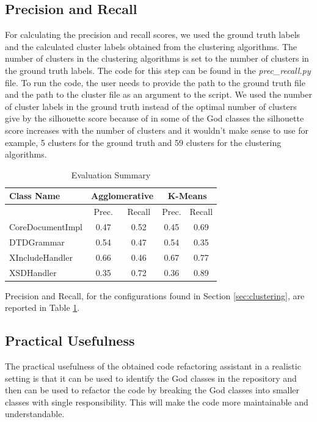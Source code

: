 \documentclass{article}
\newcommand\templateInstruction[1]{
\hl{#1}
}
\begin{document}
\subsection{Precision and Recall}
For calculating the precision and recall scores, we used the ground truth labels and the calculated cluster labels obtained from the clustering algorithms. 
The number of clusters in the clustering algorithms is set to the number of clusters in the ground truth labels. The code for this step can be found in the \textit{prec\_recall.py} file.
To run the code, the user needs to provide the path to the ground truth file and the path to the cluster file as an argument to the script.
We used the number of cluster labels in the ground truth instead of the optimal number of clusters give by the silhouette score because of in some of the God classes the silhouette score increases with the number of clusters and it wouldn't make sense to use for example,
5 clusters for the ground truth and 59 clusters for the clustering algorithms.
\begin{table}[]
    \centering
    \begin{tabular}{lcccc}
        \hline
        \textbf{Class Name} &\multicolumn{2}{c}{\textbf{Agglomerative}} & \multicolumn{2}{c}{\textbf{K-Means}} \\
        \hline
         &Prec. & Recall & Prec. & Recall \\
        \hline\hline
        {CoreDocumentImpl} & {0.47} & {0.52}& {0.45}& {0.69}\\
       {DTDGrammar} & {0.54} & {0.47}& {0.54}& {0.35}\\
        {XIncludeHandler} & {0.66} & {0.46}& {0.67}& {0.77}\\
        {XSDHandler} & {0.35} & {0.72}& {0.36}& {0.89}\\
        \hline
    \end{tabular}
    \caption{Evaluation Summary}
    \label{tab:eval}
\end{table}

Precision and Recall, for the configurations found in Section \ref{sec:clustering}, are reported in Table \ref{tab:eval}.


\subsection{Practical Usefulness}
The practical usefulness of the obtained code refactoring assistant in a realistic setting is that it can be used to identify the God classes in the repository and then can be used to refactor the code by breaking the God classes into smaller classes with single responsibility. 
This will make the code more maintainable and understandable. 
\end{document}
